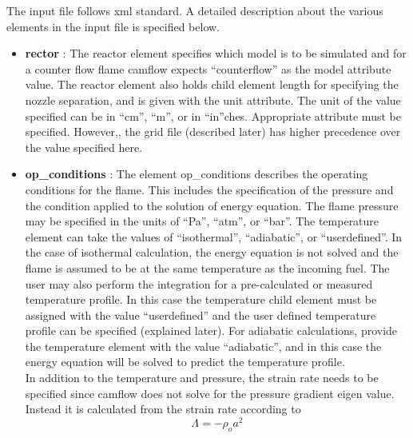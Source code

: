 The input file follows xml standard. A detailed description about the various elements in the input file is specified below.

\begin{itemize}
 \item \textbf{rector} : The reactor element specifies which model is to be simulated and for a counter flow flame camflow expects ``counterflow'' as the model attribute value. The reactor element also holds child element length for specifying the nozzle separation, and is given with the unit attribute. The unit of the value specified can be in ``cm'', ``m'', or in ``in''ches. Appropriate attribute must be specified. However,, the grid file (described later) has higher precedence over the value specified here.

\item \textbf{op\_conditions} : The element op\_conditions describes the operating conditions for the flame. This includes the specification of the pressure and the condition applied to the solution of energy equation. The flame pressure may be specified in the units of ``Pa'', ``atm'', or ``bar''. The temperature element can take the values of ``isothermal'', ``adiabatic'', or ``userdefined''. In the case of isothermal calculation, the energy equation is not solved and the flame is assumed to be at the same temperature as the incoming fuel. The user may also perform the integration for a pre-calculated or measured temperature profile. In this case the temperature child element must be assigned with the value ``userdefined'' and the user defined temperature profile can be specified (explained later). For adiabatic calculations, provide the temperature element with the value ``adiabatic'', and in this case the energy equation will be solved to predict the temperature profile.\\

In addition to the temperature and pressure, the strain rate needs to be specified since camflow does not solve for the pressure gradient eigen value. Instead it is calculated from the strain rate according to
\begin{equation}
 \Lambda = -\rho_o a^2
\end{equation}


\end{itemize}
